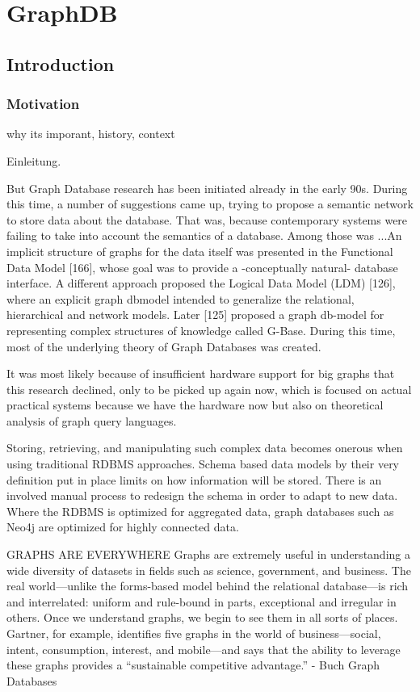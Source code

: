 \chapter{GraphDB}

\section{Introduction}
\subsection{Motivation}
why its imporant, history, context

Einleitung.

But Graph Database research has been initiated already in the early 90s. During this time, a number of suggestions came up, trying to  propose a semantic network to store data about the database. That was, because contemporary systems were failing to take into account the semantics of a database.
Among those was  ...An implicit structure of graphs for the data itself was presented in the Functional Data Model [166], whose goal was to provide a -conceptually natural- database interface. A different approach proposed the Logical Data Model (LDM) [126], where an explicit graph dbmodel intended to generalize the relational, hierarchical and network models. Later [125] proposed a graph db-model for representing complex structures of knowledge called G-Base. \citep{Angles2018AnIT}
During this time, most of the underlying theory of Graph Databases was created.

It was most likely because of insufficient hardware support for big graphs that this research declined, only to be picked up again now, which is focused on actual practical systems because we have the hardware now but also on theoretical analysis of graph query languages. \citep{Angles2018AnIT}


Storing, retrieving, and
manipulating such complex data becomes onerous when using traditional RDBMS approaches. Schema based data models by
their very definition put in place limits on how information will be stored. There is an involved manual process to redesign
the schema in order to adapt to new data. Where the RDBMS is optimized for aggregated data, graph databases such as
Neo4j are optimized for highly connected data.

GRAPHS ARE EVERYWHERE
Graphs are extremely useful in understanding a wide diversity of datasets in fields such as science, government, and business. The real world—unlike the forms-based model behind the relational database—is rich and interrelated: uniform and rule-bound in parts, exceptional and irregular in others. Once we understand graphs, we begin to see them in all sorts of places. Gartner, for example, identifies five graphs in the world of business—social, intent, consumption, interest, and mobile—and says that the ability to leverage these graphs provides a “sustainable competitive advantage.”
- Buch Graph Databases 


